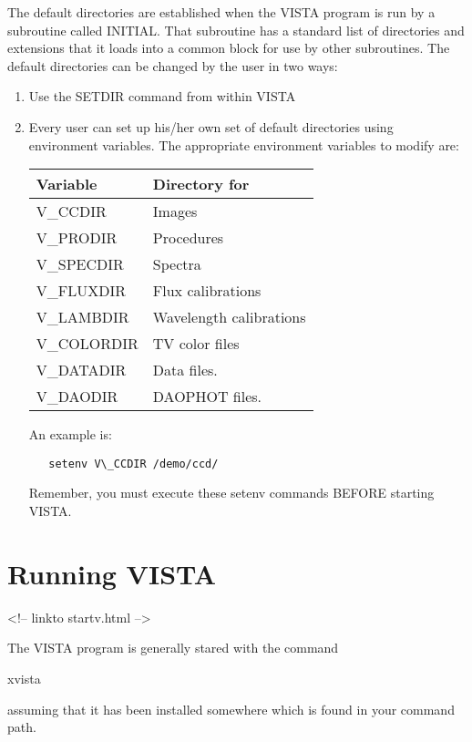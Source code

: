 The default directories are established when the VISTA program is run by a
subroutine called INITIAL.  That subroutine has a standard list of
directories and extensions that it loads into a common block for use by
other subroutines. The default directories can be changed by the user in
two ways:

\begin{enumerate}
   \item Use the SETDIR command from within VISTA

   \item Every user can set up his/her own set of default directories using
         environment variables. The appropriate environment variables to
         modify are:\newline
\begin{tabular}{ll}
   Variable    & Directory for \\ \hline
   V\_CCDIR    & Images \\
   V\_PRODIR   & Procedures \\
   V\_SPECDIR  & Spectra \\
   V\_FLUXDIR  & Flux calibrations \\
   V\_LAMBDIR  & Wavelength calibrations \\
   V\_COLORDIR & TV color files \\
   V\_DATADIR  & Data files. \\
   V\_DAODIR   & DAOPHOT files. \\ \hline
\end{tabular}

An example is:
\begin{verbatim}
   setenv V\_CCDIR /demo/ccd/
\end{verbatim}
Remember, you must execute these setenv commands BEFORE starting VISTA.

\end{enumerate}

\section{Running VISTA}
\begin{rawhtml}
<!-- linkto startv.html -->
\end{rawhtml}


The VISTA program is generally stared with the command
\begin{example}
   \item[xvista\hfill]{}
\end{example}
assuming that it has been installed somewhere which is found in your
command path.

